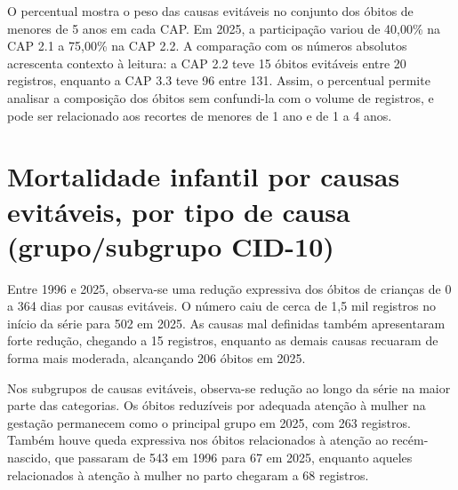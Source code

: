 O percentual mostra o peso das causas evitáveis no conjunto dos óbitos de menores de 5 anos em cada CAP. Em 2025, a participação variou de 40,00\% na CAP 2.1 a 75,00\% na CAP 2.2. A comparação com os números absolutos acrescenta contexto à leitura: a CAP 2.2 teve 15 óbitos evitáveis entre 20 registros, enquanto a CAP 3.3 teve 96 entre 131. Assim, o percentual permite analisar a composição dos óbitos sem confundi-la com o volume de registros, e pode ser relacionado aos recortes de menores de 1 ano e de 1 a 4 anos.


\section{Mortalidade infantil por causas evitáveis, por tipo de causa (grupo/\allowbreak{}subgrupo CID-10)}


Entre 1996 e 2025, observa-se uma redução expressiva dos óbitos de crianças de 0 a 364 dias por causas evitáveis. O número caiu de cerca de 1,5 mil registros no início da série para 502 em 2025. As causas mal definidas também apresentaram forte redução, chegando a 15 registros, enquanto as demais causas recuaram de forma mais moderada, alcançando 206 óbitos em 2025.


Nos subgrupos de causas evitáveis, observa-se redução ao longo da série na maior parte das categorias. Os óbitos reduzíveis por adequada atenção à mulher na gestação permanecem como o principal grupo em 2025, com 263 registros. Também houve queda expressiva nos óbitos relacionados à atenção ao recém-nascido, que passaram de 543 em 1996 para 67 em 2025, enquanto aqueles relacionados à atenção à mulher no parto chegaram a 68 registros.

